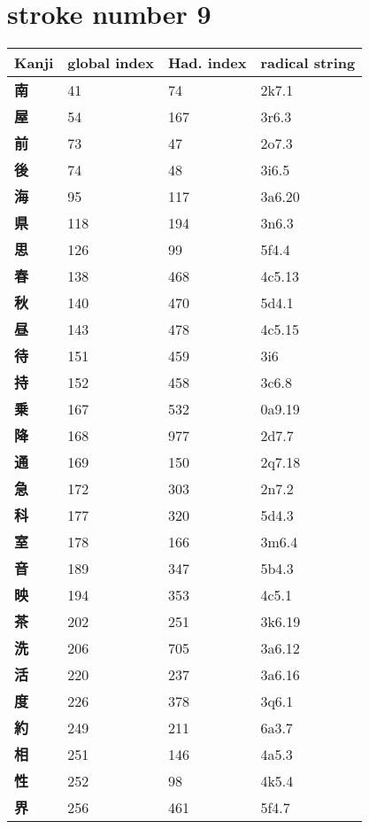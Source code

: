 \section{stroke number 9}
  \begin{longtable}[c]{llll}
    \bfseries Kanji & \bfseries global index & \bfseries Had. index & \bfseries radical string\\\hline\endhead
    \bfseries 南 & 41 & 74 & 2k7.1\\
    \bfseries 屋 & 54 & 167 & 3r6.3\\
    \bfseries 前 & 73 & 47 & 2o7.3\\
    \bfseries 後 & 74 & 48 & 3i6.5\\
    \bfseries 海 & 95 & 117 & 3a6.20\\
    \bfseries 県 & 118 & 194 & 3n6.3\\
    \bfseries 思 & 126 & 99 & 5f4.4\\
    \bfseries 春 & 138 & 468 & 4c5.13\\
    \bfseries 秋 & 140 & 470 & 5d4.1\\
    \bfseries 昼 & 143 & 478 & 4c5.15\\
    \bfseries 待 & 151 & 459 & 3i6\\
    \bfseries 持 & 152 & 458 & 3c6.8\\
    \bfseries 乗 & 167 & 532 & 0a9.19\\
    \bfseries 降 & 168 & 977 & 2d7.7\\
    \bfseries 通 & 169 & 150 & 2q7.18\\
    \bfseries 急 & 172 & 303 & 2n7.2\\
    \bfseries 科 & 177 & 320 & 5d4.3\\
    \bfseries 室 & 178 & 166 & 3m6.4\\
    \bfseries 音 & 189 & 347 & 5b4.3\\
    \bfseries 映 & 194 & 353 & 4c5.1\\
    \bfseries 茶 & 202 & 251 & 3k6.19\\
    \bfseries 洗 & 206 & 705 & 3a6.12\\
    \bfseries 活 & 220 & 237 & 3a6.16\\
    \bfseries 度 & 226 & 378 & 3q6.1\\
    \bfseries 約 & 249 & 211 & 6a3.7\\
    \bfseries 相 & 251 & 146 & 4a5.3\\
    \bfseries 性 & 252 & 98 & 4k5.4\\
    \bfseries 界 & 256 & 461 & 5f4.7\\

\end{longtable}
